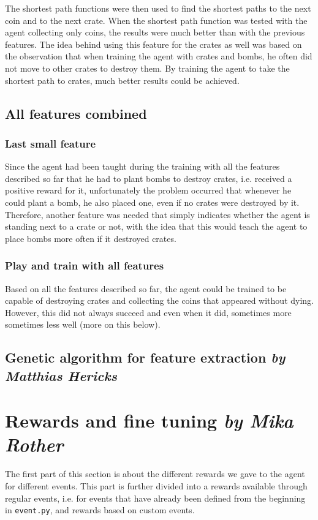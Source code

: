 The shortest path functions were then used to find the shortest paths to the next coin and to the next crate. When the shortest path function was tested with the agent collecting only coins, the results were much better than with the previous features. The idea behind using this feature for the crates as well was based on the observation that when training the agent with crates and bombs, he often did not move to other crates to destroy them. By training the agent to take the shortest path to crates, much better results could be achieved.

\subsection{All features combined}

\subsubsection*{Last small feature}
Since the agent had been taught during the training with all the features described so far that he had to plant bombs to destroy crates, i.e. received a positive reward for it, unfortunately the problem occurred that whenever he could plant a bomb, he also placed one, even if no crates were destroyed by it. Therefore, another feature was needed that simply indicates whether the agent is standing next to a crate or not, with the idea that this would teach the agent to place bombs more often if it destroyed crates.

\subsubsection*{Play and train with all features}
Based on all the features described so far, the agent could be trained to be capable of destroying crates and collecting the coins that appeared without dying. However, this did not always succeed and even when it did, sometimes more sometimes less well (more on this below). 

\subsection[Genetic algorithm for feature extraction]{Genetic algorithm for feature extraction \hfill \small \normalfont\textit{by Matthias Hericks}}



\section[Rewards and fine tuning]{Rewards and fine tuning \hfill \small \normalfont\textit{by Mika Rother}}
The first part of this section is about the different rewards we gave to the agent for different events. This part is further divided into a rewards available through regular events, i.e. for events that have already been defined from the beginning in \texttt{event.py}, and rewards based on custom events.

